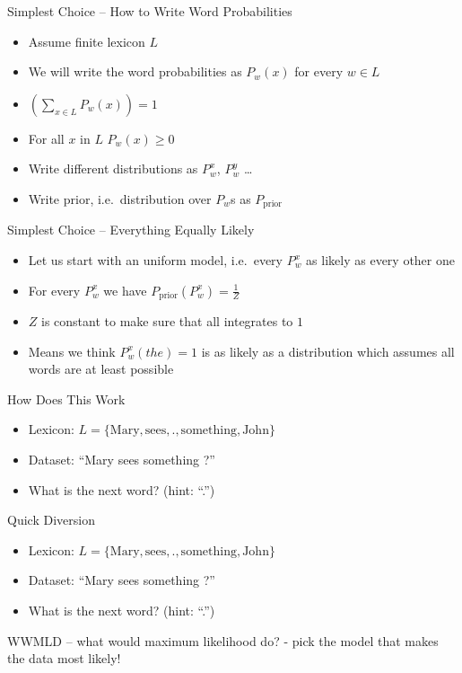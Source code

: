\documentclass[11pt]{beamer}
\begin{document}
	\begin{frame}{Simplest Choice -- How to Write Word Probabilities}
		\begin{itemize}
			\item Assume finite lexicon $L$
			\item We will write the word probabilities as $P_w(x)$ for every $w \in L$
			\item $\left( \sum_{x \in L} P_w(x) \right) = 1$
			\item For all $x$ in $L$ $P_w(x) \geq 0$
			\item Write different distributions as $P_{w}^{x}$, $P_{w}^{y}$ \dots
			\item Write prior, i.e.\ distribution over $P_{w}$s as $P_{\text{prior}}$
		\end{itemize}
	\end{frame}
	
	\begin{frame}{Simplest Choice -- Everything Equally Likely}
		\begin{itemize}
			\item Let us start with an uniform model, i.e.\ every $P^{x}_{w}$ as likely as every other one
			\item For every $P^{x}_{w}$ we have $P_{\text{prior}}(P^{x}_{w}) = \frac{1}{Z}$
			\item $Z$ is constant to make sure that all integrates to $1$
			\item Means we think $P^{x}_{w}(the) = 1$ is as likely as a distribution which assumes all words are at least possible
		\end{itemize}
	\end{frame}
	
	\begin{frame}{How Does This Work}
		\begin{itemize}
			\item Lexicon: $L = \lbrace \text{Mary}, \text{sees}, \text{.}, \text{something}, \text{John}  \rbrace$
			\item Dataset: ``Mary sees something ?''
			\item What is the next word? (hint: ``.'')
		\end{itemize}
	\end{frame}
	
	\begin{frame}{Quick Diversion}
		\begin{itemize}
			\item Lexicon: $L = \lbrace \text{Mary}, \text{sees}, \text{.}, \text{something}, \text{John}  \rbrace$
			\item Dataset: ``Mary sees something ?''
			\item What is the next word? (hint: ``.'')
		\end{itemize}
		
		WWMLD -- what would maximum likelihood do? - pick the model that makes the data most likely!
	\end{frame}
	
\end{document}
